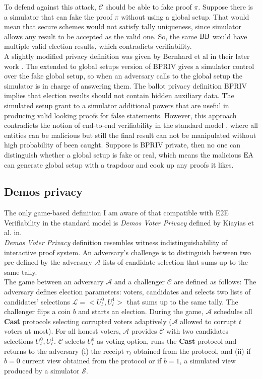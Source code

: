 To defend against this attack, $\mathcal{C}$ should be able to fake proof $\pi$. Suppose there is a simulator that can fake the proof $\pi$ without using a global setup. That would mean that secure schemes would not satisfy tally uniqueness, since simulator allows any result to be accepted as the valid one. So, the same $\operatorname{BB}$ would have multiple valid election results, which contradicts verifiability. \\ 

A slightly modified privacy definition was given by Bernhard et al in their later work \cite{Bernhard2015}. The extended to global setups version of BPRIV gives a simulator control over the fake global setup, so when an adversary calls to the global setup the simulator is in charge of answering them. The ballot privacy definition BPRIV implies that election results should not contain hidden auxiliary data. The simulated setup grant to a simulator additional powers that are useful in producing valid looking proofs for false statements. However, this approach contradicts the notion of end-to-end verifiability in the standard model \cite{Kiayias2015a}, where all entities can be malicious but still the final result can not be manipulated without high probability of been caught. Suppose is BPRIV private, then no one can distinguish whether a global setup is fake or real, which means the malicious $\operatorname{EA}$ can generate global setup with a trapdoor and cook up any proofs it likes. 

 \subsection{Demos privacy}
 The only game-based definition I am aware of that compatible with E2E Verifiability in the standard model is \textit{Demos Voter Privacy} defined by Kiayias et al. in\cite{Kiayias2015a}. \\
 
 \textit{Demos Voter Privacy} definition resembles witness indistinguishability of interactive proof system. An adversary's challenge is to distinguish between two pre-defined by the adversary  $\mathcal{A}$ lists of candidate selection that sums up to the same tally. \\
 
 The game between an adversary $\mathcal{A}$ and a challenger $\mathcal{C}$ are defined as follows: The adversary defines election parameters: voters, candidates and selects two lists of candidates' selections $\mathcal{L} = <U_l^0, U_l^1>$  that sums up to the same tally. The challenger flips a coin $b$ and starts an election. During the game,   $\mathcal{A}$ schedules all \textbf{Cast} protocols selecting corrupted voters adaptively ($\mathcal{A}$ allowed to corrupt $t$ voters at most). For all honest voters,  $\mathcal{A}$ provides $\mathcal{C}$ with two candidates selections $U_l^0, U_l^1$. $\mathcal{C}$ selects $U_l^b$ as voting option, runs the \textbf{Cast}  protocol and returns to the adversary (i) the receipt $r_l$ obtained from the protocol, and (ii) if $b = 0$ current view obtained from the protocol or if $b =1$, a simulated view produced by a simulator $\mathcal{S}$. \\
 
